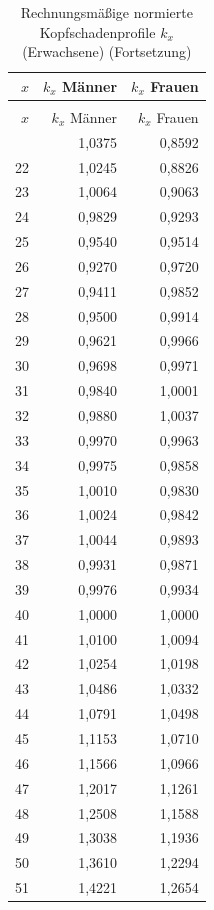\begin{small}
\begin{longtable}{rrr}
\caption{Rechnungsmäßige normierte Kopfschadenprofile $k_x$ (Erwachsene)}\label{tab:kx}\\
\toprule
$x$ & $k_x$ Männer & $k_x$ Frauen \\
\midrule
\endfirsthead
\caption[]{Rechnungsmäßige normierte Kopfschadenprofile $k_x$ (Erwachsene) (Fortsetzung)}\\
\toprule
$x$ & $k_x$ Männer & $k_x$ Frauen \\
\midrule
\endhead
\bottomrule
\endfoot
21 & 1,0375 & 0,8592 \\
22 & 1,0245 & 0,8826 \\
23 & 1,0064 & 0,9063 \\
24 & 0,9829 & 0,9293 \\
25 & 0,9540 & 0,9514 \\
26 & 0,9270 & 0,9720 \\
27 & 0,9411 & 0,9852 \\
28 & 0,9500 & 0,9914 \\
29 & 0,9621 & 0,9966 \\
30 & 0,9698 & 0,9971 \\
31 & 0,9840 & 1,0001 \\
32 & 0,9880 & 1,0037 \\
33 & 0,9970 & 0,9963 \\
34 & 0,9975 & 0,9858 \\
35 & 1,0010 & 0,9830 \\
36 & 1,0024 & 0,9842 \\
37 & 1,0044 & 0,9893 \\
38 & 0,9931 & 0,9871 \\
39 & 0,9976 & 0,9934 \\
40 & 1,0000 & 1,0000 \\
41 & 1,0100 & 1,0094 \\
42 & 1,0254 & 1,0198 \\
43 & 1,0486 & 1,0332 \\
44 & 1,0791 & 1,0498 \\
45 & 1,1153 & 1,0710 \\
46 & 1,1566 & 1,0966 \\
47 & 1,2017 & 1,1261 \\
48 & 1,2508 & 1,1588 \\
49 & 1,3038 & 1,1936 \\
50 & 1,3610 & 1,2294 \\
51 & 1,4221 & 1,2654 \\

\end{longtable}
\end{small}

